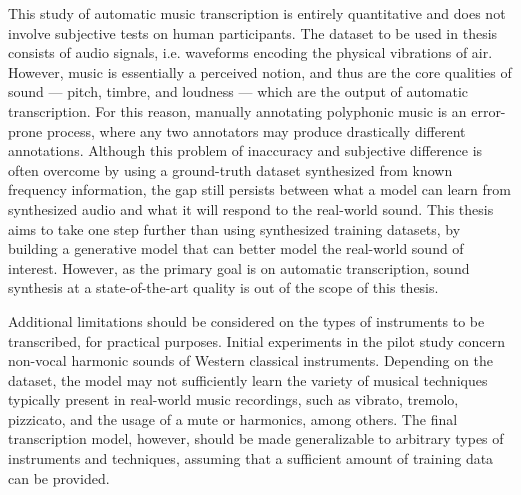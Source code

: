 This study of automatic music transcription is entirely quantitative and does not involve subjective tests on human participants.
The dataset to be used in thesis consists of audio signals, i.e. waveforms encoding the physical vibrations of air.
However, music is essentially a perceived notion, and thus are the core qualities of sound --- pitch, timbre, and loudness --- which are the output of automatic transcription.
For this reason, manually annotating polyphonic music is an error-prone process, where any two annotators may produce drastically different annotations.
Although this problem of inaccuracy and subjective difference is often overcome by using a ground-truth dataset synthesized from known frequency information, the gap still persists between what a model can learn from synthesized audio and what it will respond to the real-world sound.
This thesis aims to take one step further than using synthesized training datasets, by building a generative model that can better model the real-world sound of interest.
However, as the primary goal is on automatic transcription, sound synthesis at a state-of-the-art quality is out of the scope of this thesis.

Additional limitations should be considered on the types of instruments to be transcribed, for practical purposes.
Initial experiments in the pilot study concern non-vocal harmonic sounds of Western classical instruments.
Depending on the dataset, the model may not sufficiently learn the variety of musical techniques typically present in real-world music recordings, such as vibrato, tremolo, pizzicato, and the usage of a mute or harmonics, among others.
The final transcription model, however, should be made generalizable to arbitrary types of instruments and techniques, assuming that a sufficient amount of training data can be provided.


